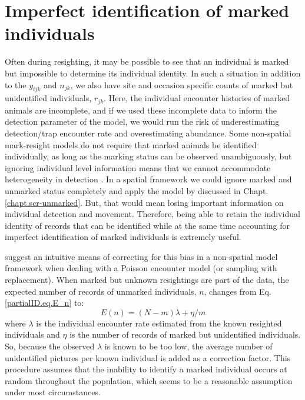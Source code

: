 \section  {Imperfect identification of marked individuals}
\label{partialID.sec.IDrate}

Often during resighting, it may be possible to see that an individual
is marked but impossible to determine its individual identity. In such
a situation in addition to the $y_{ijk}$ and $n_{jk}$, we also have
site and occasion specific counts of marked but unidentified
individuals, $r_{jk}$. Here, the individual encounter histories of
marked animals are incomplete, and if we used these incomplete data to
inform the detection parameter of the model, we would run the risk of
underestimating detection/trap encounter rate and overestimating
abundance. Some non-spatial mark-resight models do not require that
marked animals be identified individually, as long as the marking
status can be observed unambiguously, but ignoring individual level
information means that we cannot accommodate heterogeneity in
detection \citep{mcclintock_white:2010}. In a spatial framework we
could ignore marked and unmarked status completely and apply the model
by \citet{chandler_royle:2012} discussed in
Chapt. \ref{chapt.scr-unmarked}. But, that would mean losing
important information on individual detection and movement. Therefore,
being able to retain the individual identity of records that can be
identified while at the same time accounting for imperfect identification of marked individuals is extremely useful.

\citet{mcclintock_etal:2009biometrics,mcclintock_etal:2009mdp} suggest
an intuitive means of correcting for this bias in a non-spatial model
framework when dealing with a Poisson encounter model (or sampling
with replacement). When marked but unknown resightings are part of the
data, the expected number of records of unmarked individuals, $n$, changes from Eq. \ref{partialID.eq.E_n} to:
\[
E(n) = (N-m) { \lambda  + \eta/m}
\]
where $\lambda$ is the individual encounter rate estimated from the known resighted individuals and $\eta$ is the number of records of marked but unidentified individuals. So, because the observed $\lambda$ is known to be too low, the average number of unidentified pictures per known individual is added as a correction factor. This procedure assumes that the inability to identify a marked individual occurs at random throughout the population, which seems to be a reasonable assumption under most circumstances.


